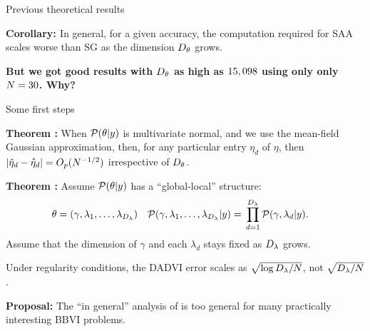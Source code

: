 \begin{frame}[t]{Previous theoretical results}
    
    \noindent
    \textbf{Corollary: \citep{kim:2015:guidetosaa}}
    In general, for a given accuracy, the computation required for SAA 
    scales worse than SG as the dimension ${D_{\theta}}$ grows.
    
    \pause
    \textbf{
    But we got good results with ${D_{\theta}}$ as
    high as $15,098$ using only
    only $N = 30$.  Why?}
    
    
    \end{frame}
    
    
    
    
    \begin{frame}{Some first steps}
    
    \noindent
    \textbf{Theorem \citep{giordano:2023:dadvi}:} When $\mathcal{P}(\theta \vert y)$ is multivariate
    normal, and we use the mean-field Gaussian approximation, then, for any
    particular entry $\eta_d$ of $\eta$, then $\left| \hat{\eta}_d - \accentset{*}{\eta}_d\right| =
    O_p(N^{-1/2})$ irrespective of ${D_{\theta}}$.
    
    \pause
    \vspace{2em}
    \noindent
    \textbf{Theorem \citep{giordano:2023:dadvi}:} Assume $\mathcal{P}(\theta \vert y)$ has a ``global-local''
    structure:
    \begin{align*}
    \theta ={}& (\gamma, \lambda_1, \ldots, \lambda_{D_{\lambda}}) &
    \mathcal{P}(\gamma, \lambda_1, \ldots, \lambda_{D_{\lambda}} | y) ={}&
    \prod_{d=1}^{{D_{\lambda}}} \mathcal{P}(\gamma, \lambda_d \vert y).
    \end{align*}
    Assume that the dimension of $\gamma$ and each $\lambda_d$ stays fixed as
    ${D_{\lambda}}$ grows.
    
    Under regularity conditions, the DADVI error
    scales as $\sqrt{\log {D_{\lambda}} / N}$, not $\sqrt{{D_{\lambda}} / N}$.
    
    \vspace{2em}
    
    \pause
    \noindent
    \textbf{Proposal: }  The ``in general'' analysis of \citep{nemirovski:2009:sgdvsfixed}
    is too general for many practically interesting BBVI problems.
    
    \end{frame}
    
